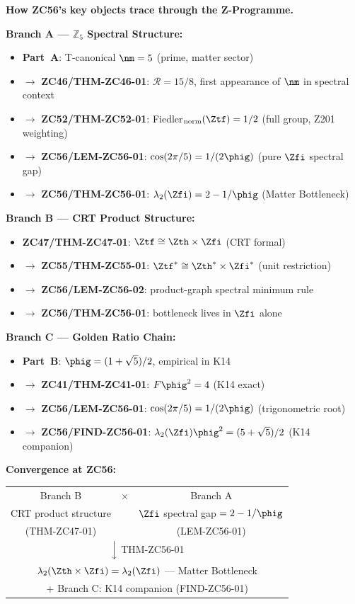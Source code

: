 \documentclass[12pt, a4paper]{article}
\begin{document}
\begin{genealogybox}
\textbf{How ZC56's key objects trace through the Z-Programme.}

\medskip
\textbf{Branch A --- $\mathbb{Z}_5$ Spectral Structure:}
\begin{itemize}[leftmargin=2em, noitemsep]
\item \textbf{Part~A}: T-canonical $\nm=5$ (prime, matter sector)
\item $\to$ \textbf{ZC46/THM-ZC46-01}: $\mathcal{R}=15/8$,
  first appearance of $\nm$ in spectral context
\item $\to$ \textbf{ZC52/THM-ZC52-01}: Fiedler$_{\rm norm}(\Ztf)=1/2$
  (full group, Z201 weighting)
\item $\to$ \textbf{ZC56/LEM-ZC56-01}: $\cos(2\pi/5)=1/(2\phig)$
  (pure $\Zfi$ spectral gap)
\item $\to$ \textbf{ZC56/THM-ZC56-01}: $\lambda_2(\Zfi)=2-1/\phig$
  (Matter Bottleneck)
\end{itemize}

\medskip
\textbf{Branch B --- CRT Product Structure:}
\begin{itemize}[leftmargin=2em, noitemsep]
\item \textbf{ZC47/THM-ZC47-01}: $\Ztf\cong\Zth\times\Zfi$ (CRT formal)
\item $\to$ \textbf{ZC55/THM-ZC55-01}: $\Ztf^*\cong\Zth^*\times\Zfi^*$
  (unit restriction)
\item $\to$ \textbf{ZC56/LEM-ZC56-02}: product-graph spectral minimum rule
\item $\to$ \textbf{ZC56/THM-ZC56-01}: bottleneck lives in $\Zfi$ alone
\end{itemize}

\medskip
\textbf{Branch C --- Golden Ratio Chain:}
\begin{itemize}[leftmargin=2em, noitemsep]
\item \textbf{Part~B}: $\phig=(1+\sqrt{5})/2$, empirical in K14
\item $\to$ \textbf{ZC41/THM-ZC41-01}: $F\phig^2=4$ (K14 exact)
\item $\to$ \textbf{ZC56/LEM-ZC56-01}: $\cos(2\pi/5)=1/(2\phig)$
  (trigonometric root)
\item $\to$ \textbf{ZC56/FIND-ZC56-01}: $\lambda_2(\Zfi)\phig^2=(5+\sqrt{5})/2$
  (K14 companion)
\end{itemize}

\medskip
\textbf{Convergence at ZC56:}
\begin{center}
\begin{tabular}{@{}ccc@{}}
Branch B & $\times$ & Branch A \\
CRT product structure & & $\Zfi$ spectral gap $=2-1/\phig$ \\
(THM-ZC47-01) & & (LEM-ZC56-01) \\
\multicolumn{3}{c}{$\Big\downarrow$ THM-ZC56-01} \\
\multicolumn{3}{c}{$\lambda_2(\Zth\times\Zfi)=\lambda_2(\Zfi)$
  --- Matter Bottleneck} \\
\multicolumn{3}{c}{+ Branch C: K14 companion (FIND-ZC56-01)} \\
\end{tabular}
\end{center}


\end{genealogybox}
\end{document}
